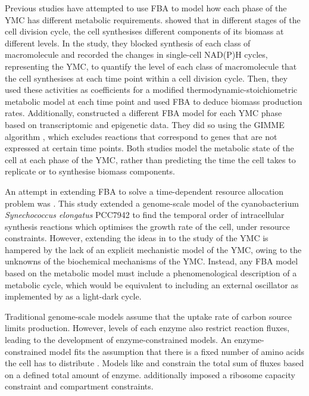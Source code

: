 Previous studies have attempted to use FBA to model how each phase of the YMC has different metabolic requirements.
\textcite{takhaveevTemporalSegregationBiosynthetic2023} showed that in different stages of the cell division cycle, the cell synthesises different components of its biomass at different levels.
In the study, they blocked synthesis of each class of macromolecule and recorded the changes in single-cell NAD(P)H cycles, representing the YMC, to quantify the level of each class of macromolecule that the cell synthesises at each time point within a cell division cycle.
Then, they used these activities as coefficients for a modified thermodynamic-stoichiometric metabolic model at each time point and used FBA to deduce biomass production rates.
Additionally, \textcite{cesurGenomeWideAnalysisYeast} constructed a different FBA model for each YMC phase based on transcriptomic and epigenetic data.
They did so using the GIMME algorithm \parencite{beckerContextSpecificMetabolicNetworks2008}, which excludes reactions that correspond to genes that are not expressed at certain time points.
Both studies model the metabolic state of the cell at each phase of the YMC, rather than predicting the time the cell takes to replicate or to synthesise biomass components.

An attempt in extending FBA to solve a time-dependent resource allocation problem was \textcite{reimersCellularTradeoffsOptimal2017}.
This study extended a genome-scale model of the cyanobacterium \textit{Synechococcus elongatus} PCC7942 to find the temporal order of intracellular synthesis reactions which optimises the growth rate of the cell, under resource constraints.
However, extending the ideas in \textcite{reimersCellularTradeoffsOptimal2017} to the study of the YMC is hampered by the lack of an explicit mechanistic model of the YMC, owing to the unknowns of the biochemical mechanisms of the YMC\@.
Instead, any FBA model based on the metabolic model must include a phenomenological description of a metabolic cycle, which would be equivalent to including an external oscillator as implemented by \textcite{reimersCellularTradeoffsOptimal2017} as a light-dark cycle.

Traditional genome-scale models assume that the uptake rate of carbon source limits production.
However, levels of each enzyme also restrict reaction fluxes, leading to the development of enzyme-constrained models.
An enzyme-constrained model fits the assumption that there is a fixed number of amino acids the cell has to distribute \parencite{weisseMechanisticLinksCellular2015}.
Models like \textcite{sanchezImprovingPhenotypePredictions2017} and \textcite{elsemmanWholecellModelingYeast2022} constrain the total sum of fluxes based on a defined total amount of enzyme.
\textcite{elsemmanWholecellModelingYeast2022} additionally imposed a ribosome capacity constraint and compartment constraints.

